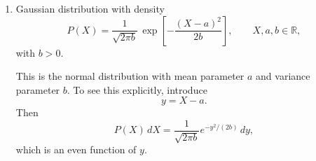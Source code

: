 \documentclass[11pt,a4paper]{scrartcl}
\newcommand{\R}{\mathbb{R}}
\begin{document}
\begin{enumerate}[label=(\alph*)]
\begin{calculationbox}
    Next, compute $\langle X(X-1)\rangle$:
    \begin{align*}
        \langle X(X-1)\rangle
        &= \sum_{X=0}^\infty X(X-1)\frac{\lambda^X e^{-\lambda}}{X!}.
    \end{align*}
    Again only $X\ge 2$ contributes:
    \begin{align*}
        \langle X(X-1)\rangle
        &= e^{-\lambda}\sum_{X=2}^\infty \frac{\lambda^X}{(X-2)!} \\
        &= \lambda^2 e^{-\lambda}\sum_{X=2}^\infty \frac{\lambda^{X-2}}{(X-2)!}.
    \end{align*}
    With $m=X-2$:
    \begin{align*}
        \langle X(X-1)\rangle
        &= \lambda^2 e^{-\lambda}\sum_{m=0}^\infty \frac{\lambda^m}{m!} \\
        &= \lambda^2.
    \end{align*}

    Since
    \[
    X^2=X(X-1)+X,
    \]
    we obtain
    \begin{align*}
        \langle X^2\rangle
        &= \langle X(X-1)\rangle+\langle X\rangle \\
        &= \lambda^2+\lambda.
    \end{align*}
    Therefore,
    \begin{align*}
        \sigma^2
        &= \langle X^2\rangle-\mu^2 \\
        &= (\lambda^2+\lambda)-\lambda^2 \\
        &= \lambda.
    \end{align*}
    \end{calculationbox}

    \begin{answerbox}
    For the Poisson distribution,
    \[
    \boxed{\mu=\lambda, \qquad \sigma^2=\lambda.}
    \]
    Thus for a Poisson distribution the mean and variance are equal.
    \end{answerbox}

    \item Gaussian distribution with density
    \[
    P(X)=\frac{1}{\sqrt{2\pi b}}\,\exp\!\left[-\frac{(X-a)^2}{2b}\right], \qquad X,a,b\in\R,
    \]
    with $b>0$.

    \begin{calculationbox}
    This is the normal distribution with mean parameter $a$ and variance parameter $b$.
    To see this explicitly, introduce
    \[
    y=X-a.
    \]
    Then
    \[
    P(X)\,dX = \frac{1}{\sqrt{2\pi b}} e^{-y^2/(2b)}\,dy,
    \]
    which is an even function of $y$.


\end{calculationbox}
\end{enumerate}
\end{document}
